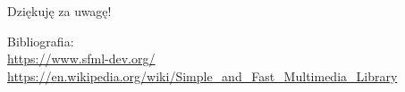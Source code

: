\documentclass[12pt]{beamer}
\begin{document}
    \begin{frame}

        \flushleft
        \huge{Dziękuję za uwagę!}

        \vspace{90pt}

        \large{Bibliografia:} \\

        \textcolor{green}{
            \url{https://www.sfml-dev.org/} \\
            \url{https://en.wikipedia.org/wiki/Simple_and_Fast_Multimedia_Library} \\
        }
        

    \end{frame}
\end{document}

